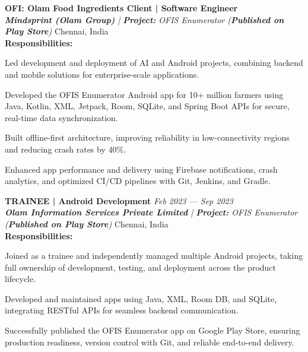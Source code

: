 \begin{list}{}{\setlength{\leftmargin}{1em}}
\vspace{1em}

\textcolor[RGB]{0,128,128}{\textbf{\large OFI: Olam Food Ingredients Client | Software Engineer}} \\
\textit{\textcolor[RGB]{203,32,38}{\textbf{Mindsprint (Olam Group)}} | {\textbf{Project:}} OFIS Enumerator (\textbf{Published on Play Store})} \hfill Chennai, India \\

\textbf{Responsibilities:}
\vspace{-0.5em}
\begin{zitemize}
    \item Led development and deployment of AI and Android projects, combining backend and mobile solutions for enterprise-scale applications.
    \item Developed the OFIS Enumerator Android app for 10+ million farmers using Java, Kotlin, XML, Jetpack, Room, SQLite, and Spring Boot APIs for secure, real-time data synchronization.
    \item Built offline-first architecture, improving reliability in low-connectivity regions and reducing crash rates by 40\%.
    \item Enhanced app performance and delivery using Firebase notifications, crash analytics, and optimized CI/CD pipelines with Git, Jenkins, and Gradle.
\end{zitemize}

\end{list}

\vspace{1em}


\textcolor[RGB]{0,128,128}{\textbf{\large TRAINEE | Android Development}} \hfill \textit{Feb 2023 --- Sep 2023} \\
\textit{\textcolor[RGB]{203,32,38}{\textbf{Olam Information Services Private Limited}} | {\textbf{Project:}} OFIS Enumerator (\textbf{Published on Play Store})} \hfill Chennai, India \\

\textbf{Responsibilities:}
\vspace{-0.5em}
\begin{zitemize}
\item Joined as a trainee and independently managed multiple Android projects, taking full ownership of development, testing, and deployment across the product lifecycle.
\item Developed and maintained apps using Java, XML, Room DB, and SQLite, integrating RESTful APIs for seamless backend communication.
\item Successfully published the OFIS Enumerator app on Google Play Store, ensuring production readiness, version control with Git, and reliable end-to-end delivery.
\end{zitemize}




